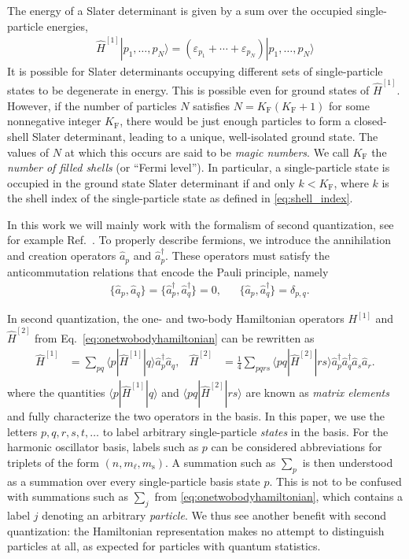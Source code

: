 The energy of a Slater determinant is given by a sum over the occupied single-particle energies,
\begin{align*}
  \hat{H}^{[1]} | p_1, \ldots, p_N \rangle = (\varepsilon_{p_1} + \cdots + \varepsilon_{p_N}) | p_1, \ldots, p_N \rangle
\end{align*}
It is possible for Slater determinants occupying different sets of
single-particle states to be degenerate in energy.  This is possible
even for ground states of $\hat{H}^{[1]}$.  However, if the number of
particles $N$ satisfies $N = K_{\mathrm{F}} (K_{\mathrm{F}} + 1)$ for
some nonnegative integer $K_{\mathrm{F}}$, there would be just enough
particles to form a closed-shell Slater determinant, leading to a
unique, well-isolated ground state.  The values of $N$ at which this
occurs are said to be \textit{magic numbers}.  We call
$K_{\mathrm{F}}$ the \textit{number of filled shells} (or ``Fermi
level'').  In particular, a single-particle state is occupied in the
ground state Slater determinant if and only $k < K_{\mathrm{F}}$,
where $k$ is the shell index of the single-particle state as defined
in \eqref{eq:shell_index}.

In this work we will mainly work with the formalism of second quantization, see for example Ref.~\cite{shavitt2009many}.
To properly describe fermions, we introduce the annihilation and creation operators $\hat a_p$ and $\hat a_p^\dagger$. These operators must satisfy the anticommutation relations that encode the Pauli principle, namely
\begin{align*}
  &\{\hat a_p, \hat a_q\} = \{\hat a_p^\dagger, \hat a_q^\dagger\} = 0, &
  &\{\hat a_p, \hat a_q^\dagger\} = \delta_{p, q}.
\end{align*}

In second quantization, the one- and two-body Hamiltonian operators $H^{[1]}$ and $\hat{H}^{[2]}$ from Eq.~\eqref{eq:onetwobodyhamiltonian} can be rewritten as
\begin{align} \label{eq:second_quantized_hamiltonian}
  \hat H^{[1]} &= \sum_{pq} \langle p | \hat{H}^{[1]} | q \rangle \hat a_p^\dagger \hat a_q^{}, &
  \hat{H}^{[2]} &= \frac{1}{4} \sum_{pqrs} \langle pq | \hat{H}^{[2]} | rs \rangle \hat a_p^\dagger \hat a_q^\dagger \hat a_s^{} \hat a_r^{}.
\end{align}
where the quantities $\langle p | \hat{H}^{[1]} | q \rangle$
and $\langle pq | \hat{H}^{[2]} | rs \rangle$ are known
as \textit{matrix elements} and fully characterize the two operators
in the basis.  In this paper, we use the letters $p, q, r, s,
t, \ldots$ to label arbitrary single-particle \textit{states} in the
basis.  For the harmonic oscillator basis, labels such as $p$ can be
considered abbreviations for triplets of the form $(n, m_\ell,
m_{\mathrm{s}})$.  A summation such as $\sum_p$ is then understood as
a summation over every single-particle basis state $p$.  This is not
to be confused with summations such as $\sum_j$
from \eqref{eq:onetwobodyhamiltonian}, which contains a label $j$
denoting an arbitrary \textit{particle}.  We thus see another benefit
with second quantization: the Hamiltonian representation makes no
attempt to distinguish particles at all, as expected for particles
with quantum statistics.

